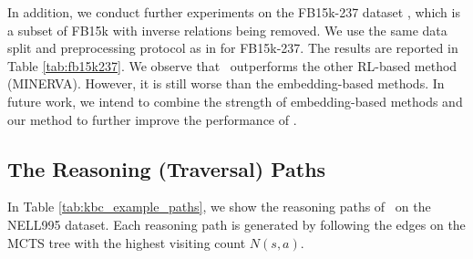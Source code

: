 In addition, we conduct further experiments on the FB15k-237 dataset \cite{Kristinafb15k237}, which is a subset of FB15k \cite{bordes2013translating} with inverse relations being removed. We use the same data split and preprocessing protocol as in \cite{dettmers2018conve} for FB15k-237. The results are reported in Table \ref{tab:fb15k237}. We observe that \modelname~outperforms the other RL-based method (MINERVA). However, it is still worse than the embedding-based methods. In future work, we intend to combine the strength of embedding-based methods and our method to further improve the performance of \modelname.
	
	
	
	
\subsection{The Reasoning (Traversal) Paths}
\label{Appendix:three_glass_puzzle_paths}
In Table \ref{tab:kbc_example_paths}, we show the reasoning paths of \modelname~on the NELL995 dataset. Each reasoning path is generated by following the edges on the MCTS tree with the highest visiting count $N(s,a)$.


